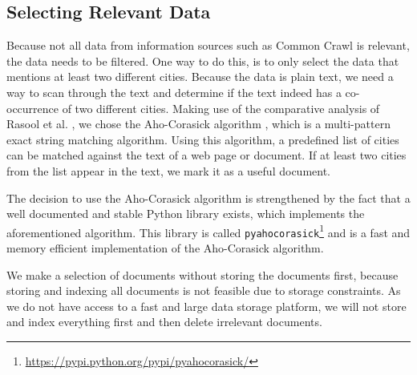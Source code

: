 \subsection{Selecting Relevant Data}
Because not all data from information sources such as Common Crawl is relevant, the data needs to be filtered. One way to do this, is to only select the data that mentions at least two different cities. Because the data is plain text, we need a way to scan through the text and determine if the text indeed has a co-occurrence of two different cities.
Making use of the comparative analysis of Rasool et al. \cite{rasool2012string}, we chose the Aho-Corasick algorithm \cite{Aho-Corasick}, which is a multi-pattern exact string matching algorithm. Using this algorithm, a predefined list of cities can be matched against the text of a web page or document. If at least two cities from the list appear in the text, we mark it as a useful document.

The decision to use the Aho-Corasick algorithm is strengthened by the fact that a well documented and stable Python library exists, which implements the aforementioned algorithm. This library is called \texttt{pyahocorasick}\footnote{\url{https://pypi.python.org/pypi/pyahocorasick/}} and is a fast and memory efficient implementation of the Aho-Corasick algorithm.

We make a selection of documents without storing the documents first, because storing and indexing all documents is not feasible due to storage constraints. As we do not have access to a fast and large data storage platform, we will not store and index everything first and then delete irrelevant documents.
